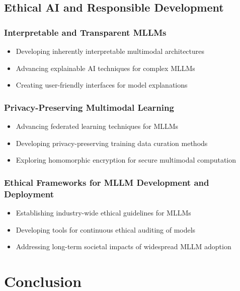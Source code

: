 \subsection{Ethical AI and Responsible Development}
\subsubsection{Interpretable and Transparent MLLMs}
\begin{itemize}
    \item Developing inherently interpretable multimodal architectures
    \item Advancing explainable AI techniques for complex MLLMs
    \item Creating user-friendly interfaces for model explanations
\end{itemize}

\subsubsection{Privacy-Preserving Multimodal Learning}
\begin{itemize}
    \item Advancing federated learning techniques for MLLMs
    \item Developing privacy-preserving training data curation methods
    \item Exploring homomorphic encryption for secure multimodal computation
\end{itemize}

\subsubsection{Ethical Frameworks for MLLM Development and Deployment}
\begin{itemize}
    \item Establishing industry-wide ethical guidelines for MLLMs
    \item Developing tools for continuous ethical auditing of models
    \item Addressing long-term societal impacts of widespread MLLM adoption
\end{itemize}

\section{Conclusion}
